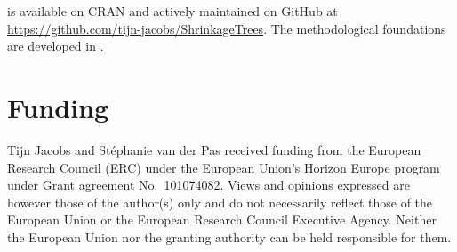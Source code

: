  is available on CRAN and actively maintained on GitHub at \url{https://github.com/tijn-jacobs/ShrinkageTrees}. The methodological foundations are developed in \citet{jacobs2025horseshoe}.

\section{Funding}\label{funding}

Tijn Jacobs and Stéphanie van der Pas received funding from the European Research Council (ERC) under the European Union's Horizon Europe program under Grant agreement No.~101074082. Views and opinions expressed are however those of the author(s) only and do not necessarily reflect those of the European Union or the European Research Council Executive Agency. Neither the European Union nor the granting authority can be held responsible for them.



\address{%
Tijn Jacobs\\
Vrije Universiteit Amsterdam\\%
Department of Mathematics\\ Amsterdam, The Netherlands\\
%
\url{https://tijn-jacobs.github.io/}\\%
\textit{ORCiD: \href{https://orcid.org/0009-0003-6188-9296}{0009-0003-6188-9296}}\\%
\href{mailto:t.jacobs@vu.nl}{\nolinkurl{t.jacobs@vu.nl}}%
}

\address{%
Stéphanie van der Pas\\
Vrije Universiteit Amsterdam\\%
Department of Mathematics\\ Amsterdam, The Netherlands\\
%
\url{https://www.stephanievanderpas.nl/}\\%
\textit{ORCiD: \href{https://orcid.org/0000-0002-2448-5378}{0000-0002-2448-5378}}\\%
\href{mailto:s.l.vander.pas@vu.nl}{\nolinkurl{s.l.vander.pas@vu.nl}}%
}

\address{%
Wessel van Wieringen\\
Vrije Universiteit AmsterdamAmsterdam University Medical Centre\\%
Department of Mathematics, Amsterdam, The Netherlands\\ Epidemiology and Data Science, Amsterdam, The Netherlands\\
%
\url{https://www.math.vu.nl/~wvanwie/}\\%
\textit{ORCiD: \href{https://orcid.org/0000-0002-5100-9123}{0000-0002-5100-9123}}\\%
\href{mailto:w.n.vanwieringen@vu.nl}{\nolinkurl{w.n.vanwieringen@vu.nl}}%
}
